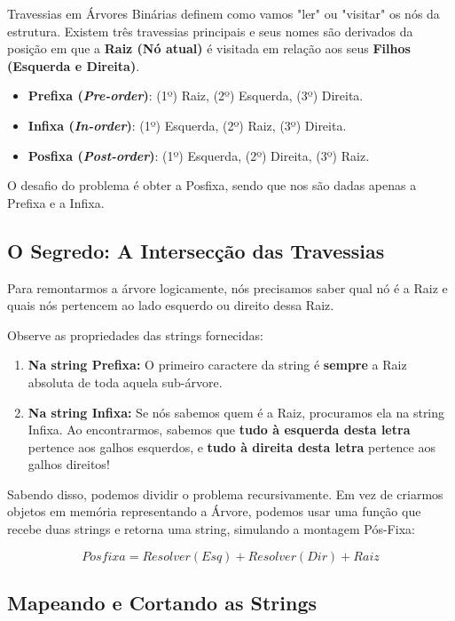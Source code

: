 \documentclass[11pt,a4paper]{article}
\begin{document}
Travessias em Árvores Binárias definem como vamos "ler" ou "visitar" os nós da estrutura. Existem três travessias principais e seus nomes são derivados da posição em que a \textbf{Raiz (Nó atual)} é visitada em relação aos seus \textbf{Filhos (Esquerda e Direita)}.

\begin{itemize}
    \item \textbf{Prefixa (\textit{Pre-order})}: (1º) Raiz, (2º) Esquerda, (3º) Direita.
    \item \textbf{Infixa (\textit{In-order})}: (1º) Esquerda, (2º) Raiz, (3º) Direita.
    \item \textbf{Posfixa (\textit{Post-order})}: (1º) Esquerda, (2º) Direita, (3º) Raiz.
\end{itemize}

O desafio do problema é obter a Posfixa, sendo que nos são dadas apenas a Prefixa e a Infixa.

\subsection{O Segredo: A Intersecção das Travessias}

Para remontarmos a árvore logicamente, nós precisamos saber qual nó é a Raiz e quais nós pertencem ao lado esquerdo ou direito dessa Raiz.

Observe as propriedades das strings fornecidas:
\begin{enumerate}
    \item \textbf{Na string Prefixa:} O primeiro caractere da string é \textbf{sempre} a Raiz absoluta de toda aquela sub-árvore.
    \item \textbf{Na string Infixa:} Se nós sabemos quem é a Raiz, procuramos ela na string Infixa. Ao encontrarmos, sabemos que \textbf{tudo à esquerda desta letra} pertence aos galhos esquerdos, e \textbf{tudo à direita desta letra} pertence aos galhos direitos!
\end{enumerate}

Sabendo disso, podemos dividir o problema recursivamente. Em vez de criarmos objetos em memória representando a Árvore, podemos usar uma função que recebe duas strings e retorna uma string, simulando a montagem Pós-Fixa:

$$ Posfixa = Resolver(Esq) + Resolver(Dir) + Raiz $$

\subsection{Mapeando e Cortando as Strings}
\end{document}
